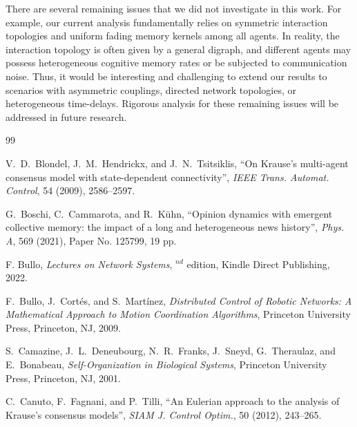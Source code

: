 \documentclass[11pt]{amsart}
\numberwithin{equation}{section}
\begin{document}
There are several remaining issues that we did not investigate in this work. For example, our current analysis fundamentally relies on symmetric interaction topologies and uniform fading memory kernels among all agents. In reality, the interaction topology is often given by a general digraph, and different agents may possess heterogeneous cognitive memory rates or be subjected to communication noise. Thus, it would be interesting and challenging to extend our results to scenarios with asymmetric couplings, directed network topologies, or heterogeneous time-delays. Rigorous analysis for these remaining issues will be addressed in future research.


\begin{thebibliography}{99}



V.~D.~Blondel, J.~M.~Hendrickx, and J.~N.~Tsitsiklis, ``On Krause's multi-agent consensus model with state-dependent connectivity'', \textit{IEEE Trans. Automat. Control}, 54 (2009), 2586--2597.

G.~Boschi, C.~Cammarota, and R.~K\"uhn, ``Opinion dynamics with emergent collective memory: the impact of a long and heterogeneous news history'', \textit{Phys. A}, 569 (2021), Paper No. 125799, 19 pp.




F. Bullo,
\newblock \emph{Lectures on Network Systems},
$^{nd}$ edition, Kindle Direct Publishing, 2022.

F.~Bullo, J.~Cort\'es, and S.~Mart\'inez, \textit{Distributed Control of Robotic Networks: A Mathematical Approach to Motion Coordination Algorithms}, Princeton University Press, Princeton, NJ, 2009.


S.~Camazine, J.~L.~Deneubourg, N.~R.~Franks, J.~Sneyd, G.~Theraulaz, and E.~Bonabeau, \textit{Self-Organization in Biological Systems}, Princeton University Press, Princeton, NJ, 2001.

C.~Canuto, F.~Fagnani, and P.~Tilli, ``An Eulerian approach to the analysis of Krause's consensus models'', \textit{SIAM J. Control Optim.}, 50 (2012), 243--265.


\end{thebibliography}
\end{document}
